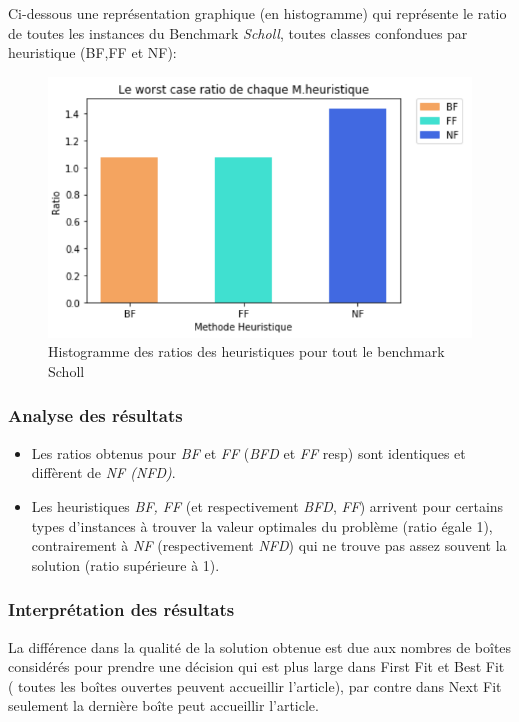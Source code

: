 \documentclass[class=article, crop=false]{standalone}
\begin{document}
Ci-dessous une représentation graphique (en histogramme) qui représente le ratio de toutes les instances du Benchmark \emph{Scholl}, toutes classes confondues par heuristique (BF,FF et NF): 

\begin{figure}[H] 
    \includegraphics[width=\linewidth]{../figures/Ratio_M_heuristiques.png}
    \caption{Histogramme des ratios des heuristiques pour tout le benchmark Scholl}
\end{figure}

\subsubsection{Analyse des résultats}
\begin{itemize}
    \item Les ratios obtenus pour \emph{BF} et \emph{FF} (\emph{BFD} et \emph{FF} resp) sont identiques et diffèrent de \emph{NF (NFD)}.
    \item Les heuristiques \emph{BF, FF} (et respectivement \emph{BFD}, \emph{FF}) arrivent pour certains types d’instances à trouver la valeur optimales du problème (ratio égale 1), contrairement à \emph{NF} (respectivement \emph{NFD}) qui ne trouve pas assez souvent la solution (ratio supérieure à 1).
\end{itemize}

\subsubsection{Interprétation des résultats}
La différence dans la qualité de la solution obtenue est due aux nombres de boîtes considérés pour prendre une décision qui est plus large dans First Fit et Best Fit ( toutes les boîtes ouvertes peuvent accueillir l’article), par contre dans Next Fit seulement la dernière boîte peut accueillir l’article.
\end{document}
